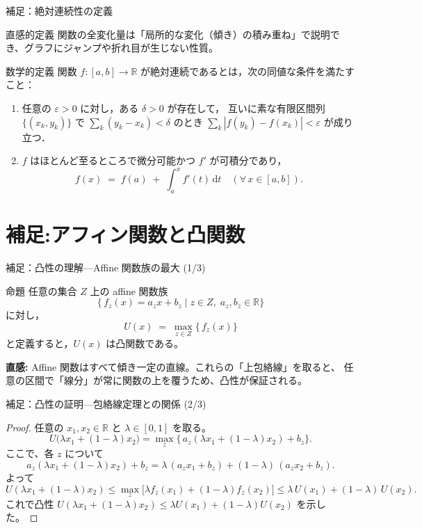 \documentclass[dvipdfmx,autodetect-engine]{beamer}
\begin{document}
\begin{frame}{補足：絶対連続性の定義}
  \small
  \begin{block}{直感的定義}
    関数の全変化量は「局所的な変化（傾き）の積み重ね」で説明でき、グラフにジャンプや折れ目が生じない性質。
  \end{block}
  \begin{block}{数学的定義}
    関数 \(f:[a,b]\to\mathbb{R}\) が絶対連続であるとは，次の同値な条件を満たすこと：
    \begin{enumerate}
      \item 任意の \(\varepsilon>0\) に対し，ある \(\delta>0\) が存在して，\newline
        互いに素な有限区間列 \(\{(x_k,y_k)\}\) で \(\sum_k(y_k - x_k)<\delta\) のとき
        \(\sum_k|f(y_k) - f(x_k)|<\varepsilon\) が成り立つ．
      \item \(f\) はほとんど至るところで微分可能かつ \(f'\) が可積分であり，
        \[
          f(x) \;=\; f(a) \;+\; \int_a^x f'(t)\,\mathrm{d}t
          \quad(\forall\,x\in[a,b]).
        \]
    \end{enumerate}
  \end{block}
\end{frame}


\section{補足:アフィン関数と凸関数}
\begin{frame}{補足：凸性の理解—Affine 関数族の最大 (1/3)}
  \begin{block}{命題}
    任意の集合 $Z$ 上の affine 関数族
    \[
      \{\,f_z(x) = a_z x + b_z \mid z\in Z,\;a_z,b_z\in\mathbb R\}
    \]
    に対し，
    \[
      U(x) \;=\;\max_{z\in Z}\{\,f_z(x)\}
    \]
    と定義すると，$U(x)$ は凸関数である。
  \end{block}
  \vspace{1ex}
  \textbf{直感:}
  Affine 関数はすべて傾き一定の直線。これらの「上包絡線」を取ると、  
  任意の区間で「線分」が常に関数の上を覆うため、凸性が保証される。
\end{frame}

\begin{frame}{補足：凸性の証明—包絡線定理との関係 (2/3)}
  \begin{proof}
    任意の $x_1,x_2\in\mathbb R$ と $\lambda\in[0,1]$ を取る。
    \[
      U\bigl(\lambda x_1 + (1-\lambda)x_2\bigr)
      = \max_{z}\{\,a_z(\lambda x_1+(1-\lambda)x_2)+b_z\}.
    \]
    ここで、各 $z$ について
    \[
      a_z(\lambda x_1+(1-\lambda)x_2)+b_z
      = \lambda\,(a_z x_1+b_z)
      + (1-\lambda)\,(a_z x_2+b_z).
    \]
    よって
    \[
      U(\lambda x_1+(1-\lambda)x_2)
      \le \max_z \bigl[\lambda f_z(x_1)+(1-\lambda)f_z(x_2)\bigr]
      \le \lambda\,U(x_1)+(1-\lambda)\,U(x_2).
    \]
    これで凸性 $U(\lambda x_1+(1-\lambda)x_2)\le\lambda U(x_1)+(1-\lambda)U(x_2)$ を示した。
  \end{proof}
\end{frame}
\end{document}
